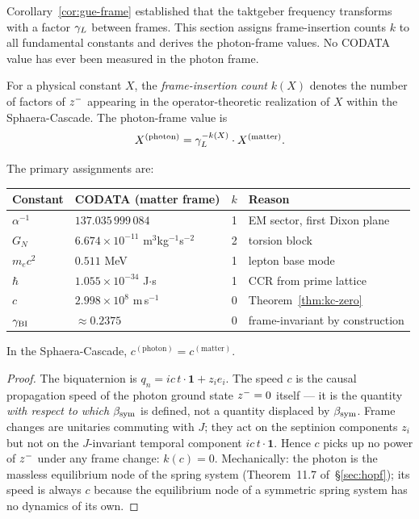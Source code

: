 \begin{remark}
Corollary~\ref{cor:gue-frame} established that the taktgeber frequency
transforms with a factor $\gamma_L$ between frames.
This section assigns frame-insertion counts $k$ to all fundamental
constants and derives the photon-frame values.
No CODATA value has ever been measured in the photon frame.
\end{remark}

\begin{definition}
For a physical constant $X$, the \emph{frame-insertion count} $k(X)$ denotes
 the number of factors of $z^-$ appearing in the operator-theoretic
 realization of $X$ within the Sphaera-Cascade.
The photon-frame value is
\[
  X^{(\mathrm{photon})} = \gamma_L^{-k(X)}\cdot X^{(\mathrm{matter})}.
\]
\end{definition}

\begin{theorem}\label{thm:k-values}
The primary assignments are:
\begin{center}
\renewcommand{\arraystretch}{1.3}
\begin{tabular}{llcl}
\toprule
Constant & CODATA (matter frame) & $k$ & Reason\\
\midrule
$\alpha^{-1}$ & $137.035\,999\,084$ & 1
  & EM sector, first Dixon plane\\
$G_N$ & $6.674\times10^{-11}$ m$^3$kg$^{-1}$s$^{-2}$ & 2
  & torsion block\\
$m_e c^2$ & $0.511$ MeV & 1
  & lepton base mode\\
$\hbar$ & $1.055\times10^{-34}$ J$\cdot$s & 1
  & CCR from prime lattice\\
$c$ & $2.998\times10^8$ m\,s$^{-1}$ & 0
  & Theorem~\ref{thm:kc-zero}\\
$\gamma_{\mathrm{BI}}$ & $\approx 0.2375$ & 0
  & frame-invariant by construction\\
\bottomrule
\end{tabular}
\end{center}
\end{theorem}

\begin{theorem}[$k(c)=0$: the speed of light is frame-invariant]
\label{thm:kc-zero}
In the Sphaera-Cascade, $c^{(\mathrm{photon})}=c^{(\mathrm{matter})}$.
\end{theorem}

\begin{proof}
The biquaternion is $q_n = ic\,t\cdot\mathbf{1}+z_i e_i$.
The speed $c$ is the causal propagation speed of the photon ground state
$z^-=0$ itself --- it is the quantity \emph{with respect to which}
$\beta_{\mathrm{sym}}$ is defined, not a quantity displaced by $\beta_{\mathrm{sym}}$.
Frame changes are unitaries commuting with $J$; they act on the septinion
components $z_i$ but not on the $J$-invariant temporal component
$ic\,t\cdot\mathbf{1}$.
Hence $c$ picks up no power of $z^-$ under any frame change:
$k(c)=0$.
Mechanically: the photon is the massless equilibrium node of the
spring system (Theorem~11.7 of~\S\ref{sec:hopf}); its speed is always $c$ because
the equilibrium node of a symmetric spring system has no dynamics of its own.
\end{proof}

